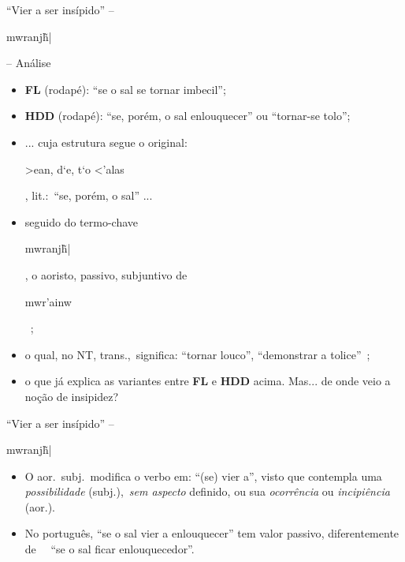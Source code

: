 \documentclass[12pt,aspectratio=169]{beamer}
\newcommand{\RED}[1]{{\textcolor{TXred}{#1}}}
\newcommand{\YEL}[1]{{\textcolor{TXyel}{#1}}}
\newcommand{\GRE}[1]{{\textcolor{TXgre}{#1}}}
\newcommand{\CYA}[1]{{\textcolor{TXcya}{#1}}}
\newcommand{\MAG}[1]{{\textcolor{TXmag}{#1}}}
\newcommand{\BRI}[1]{{\textcolor{BSpbg}{#1}}}   %
\newcommand{\GRtxt}[1]{\begin{otherlanguage}{greek}{{#1}}\end{otherlanguage}}
\begin{document}
    \begin{frame}{\BRI{``Vier a ser insípido''} -- \BRI{\GRtxt{mwranj\~h|}} -- \BRI{Análise}}
        \begin{itemize}
            \item<1-> \BRI{\textbf{FL}} (rodapé): \MAG{``se o sal se tornar imbecil''};
                \\[\medskipamount]
            \item<2-> \BRI{\textbf{HDD}} (rodapé): \MAG{``se, porém, o sal enlouquecer''} ou
                \MAG{``tornar-se tolo''};
                \\[\medskipamount]
            \item<3-> ... cuja estrutura segue o original: \YEL{\GRtxt{>ean, d`e, t`o <'alas}},
                lit.:~\MAG{``se, porém, o sal''} ...
                \\[\medskipamount]
            \item<4-> seguido do termo-chave \YEL{\GRtxt{mwranj\~h|}}, o \GRE{aoristo},
                \GRE{passivo}, \GRE{subjuntivo} de
                \YEL{\GRtxt{mwr'ainw}}~\cite{2013-MounceWD-VidaNova,
                2007-FribergB+FribergT-VidaNova, 2009-MounceWD-Vida}; %
                \\[\medskipamount]
            \item<5-> o qual, no NT, trans.,~significa: \CYA{``tornar louco''},
                \CYA{``demonstrar a tolice''}~\cite{2013-MounceWD-VidaNova};
                \\[\medskipamount]
            \item<6-> o que já explica as variantes entre \BRI{\textbf{FL}} e \BRI{\textbf{HDD}}
                acima. Mas... de onde veio a noção de insipidez?
                \\[\medskipamount]
        \end{itemize}
    \end{frame}

    \begin{frame}{\BRI{``Vier a ser insípido''} -- \GRtxt{mwranj\~h|}}
        \begin{itemize}
            \item<1-> O \GRE{aor.~subj.}~modifica o verbo em: \CYA{``}(se) \CYA{vier a''}, visto
                que contempla uma \BRI{\textit{possibilidade}} (\GRE{subj.}),~\BRI{\textit{sem
                aspecto}} definido, ou sua \BRI{\textit{ocorrência}} ou
                \BRI{\textit{incipiência}} (\GRE{aor.}).
                \\[\medskipamount]
            \item<2-> No português, \MAG{``se o sal vier a enlouquecer''} tem valor
                \GRE{passivo}, diferentemente de \ \ \RED{``se o sal ficar enlouquecedor''}.
        \end{itemize}
    \end{frame}
\end{document}
